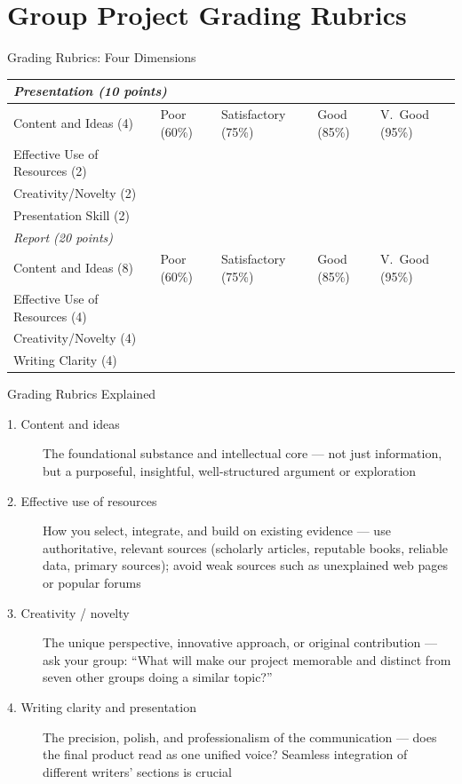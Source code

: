 \documentclass[aspectratio=169]{beamer}
\begin{document}

\section{Group Project Grading Rubrics}

\begin{frame}{Grading Rubrics: Four Dimensions}
\begin{table}
\centering
\small
\begin{tabular}{p{}p{}p{}p{}p{}}
\toprule
\multicolumn{5}{l}{\textit{Presentation (10 points)}} \\
\midrule
Content and Ideas (4) & Poor (60\%) & Satisfactory (75\%) & Good (85\%) & V.\ Good (95\%) \\
Effective Use of Resources (2) &  &  &  &  \\
Creativity/Novelty (2) &  &  &  &  \\
Presentation Skill (2) &  &  &  &  \\
\midrule
\multicolumn{5}{l}{\textit{Report (20 points)}} \\
\midrule
Content and Ideas (8) & Poor (60\%) & Satisfactory (75\%) & Good (85\%) & V.\ Good (95\%) \\
Effective Use of Resources (4) &  &  &  &  \\
Creativity/Novelty (4) &  &  &  &  \\
Writing Clarity (4) &  &  &  &  \\
\bottomrule
\end{tabular}
\end{table}
\end{frame}

\begin{frame}{Grading Rubrics Explained}
\begin{description}
  \item[1. Content and ideas] The foundational substance and intellectual core --- not just information, but a purposeful, insightful, well-structured argument or exploration
  \item[2. Effective use of resources] How you select, integrate, and build on existing evidence --- use authoritative, relevant sources (scholarly articles, reputable books, reliable data, primary sources); avoid weak sources such as unexplained web pages or popular forums
  \item[3. Creativity / novelty] The unique perspective, innovative approach, or original contribution --- ask your group: ``What will make our project memorable and distinct from seven other groups doing a similar topic?''
  \item[4. Writing clarity and presentation] The precision, polish, and professionalism of the communication --- does the final product read as one unified voice? Seamless integration of different writers' sections is crucial
\end{description}
\end{frame}
\end{document}
